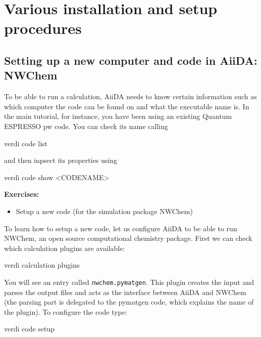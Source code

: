 

\section[Installation and Setup]{Various installation and setup procedures}
\subsection{\label{sec:codesetup}Setting up a new computer and code in AiiDA: NWChem}

To be able to run a calculation, AiiDA needs to know certain information such as which computer the code can be found on and what the executable name is. In the main tutorial, for instance, you have been using an existing Quantum ESPRESSO pw code. 
You can check its name calling 
\begin{bashcommand}
verdi code list
\end{bashcommand}
and then inpsect its properties using
\begin{bashcommand}
verdi code show <CODENAME>
\end{bashcommand}

\begin{tcolorbox}
\textbf{Exercises:}
\begin{itemize}
\item
Setup a new code (for the simulation package NWChem)
\end{itemize}
\end{tcolorbox}

To learn how to setup a new code, let us configure AiiDA to be able to run NWChem, an open source computational chemistry package.  First we can check which calculation plugins are available:

\begin{bashcommand}
verdi calculation plugins
\end{bashcommand}

You will see an entry called \texttt{nwchem.pymatgen}.  This plugin creates the input and parses the output files and acts as the interface between AiiDA and NWChem (the parsing part is delegated to the pymatgen code, which explains the name of the plugin). To configure the code type:

\begin{bashcommand}
verdi code setup
\end{bashcommand}

